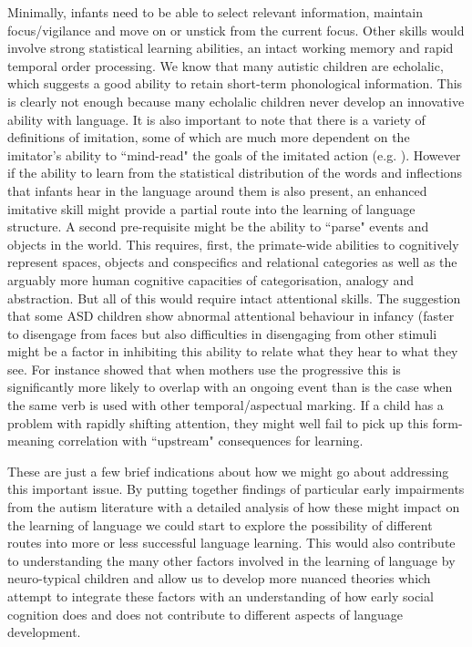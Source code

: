 \documentclass[output=paper]{langsci/langscibook}
\begin{document}
  Minimally, infants need to be able to select relevant information, maintain focus/vigilance and move on or unstick from the current focus.  Other skills would involve strong statistical learning abilities, an intact working memory and rapid temporal order processing.   We know that many autistic children are echolalic, which suggests a good ability to retain short-term phonological information.  This is clearly not enough because many echolalic children never develop an innovative ability with language. It is also important to note that there is a variety of definitions of imitation, some of which are much more dependent on the imitator’s ability to ``mind-read" the goals of the imitated action (e.g. \citeauthor{Over2013} ). However if the ability to learn from the statistical distribution of the words and inflections that infants hear in the language around them is also present, an enhanced imitative skill might provide a partial route into the learning of language structure.  A second pre-requisite might be the ability to ``parse" events and objects in the world.  This requires, first, the primate-wide abilities to cognitively represent spaces, objects and conspecifics and relational categories as well as the arguably more human cognitive capacities of categorisation, analogy and abstraction.  But all of this would require intact attentional skills.  The suggestion that some ASD children show abnormal attentional behaviour in infancy (faster to disengage from faces but also difficulties in disengaging from other stimuli \citep{Gliga2014} might be a factor in inhibiting this ability to relate what they hear to what they see.  For instance \citet{Ibbotson2014} showed that when mothers use the  progressive this is significantly more likely to overlap with an ongoing event than is the case when the same verb is used with other temporal/aspectual marking.  If a child has a problem with rapidly shifting attention, they might well fail to pick up this form-meaning correlation with ``upstream" consequences for learning.   

\largerpage
These are just a few brief indications about how we might go about addressing this important issue.  By putting together findings of particular early impairments from the autism literature with a detailed analysis of how these might impact on the learning of language we could start to explore the possibility of different routes into more or less successful language learning.  This would also contribute to understanding the many other factors  involved in the learning of language by neuro-typical children and allow us to develop more nuanced theories which  attempt to integrate these factors  with an understanding of how early social cognition does and does not contribute to different aspects of language development.
\end{document}
